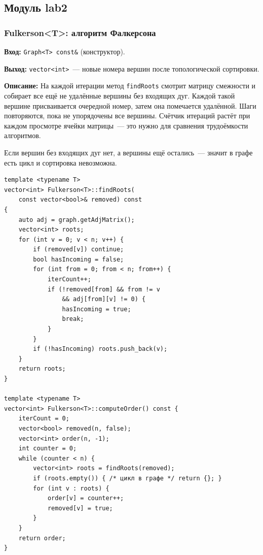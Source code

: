 \subsection{Модуль lab2}

\subsubsection{Fulkerson\textless T\textgreater: алгоритм Фалкерсона}

\textbf{Вход:} \texttt{Graph<T> const\&} (конструктор).

\textbf{Выход:} \texttt{vector<int>}~--- новые номера вершин после
топологической сортировки.

\textbf{Описание:} На каждой итерации метод \texttt{findRoots} смотрит
матрицу смежности и собирает все ещё не удалённые вершины без входящих дуг.
Каждой такой вершине присваивается очередной номер, затем она помечается
удалённой. Шаги повторяются, пока не упорядочены все вершины.
Счётчик итераций растёт при каждом просмотре ячейки матрицы~---
это нужно для сравнения трудоёмкости алгоритмов.

Если вершин без входящих дуг нет, а вершины ещё остались~--- значит в графе
есть цикл и сортировка невозможна.

\begin{lstlisting}[style=cstyle, caption={Поиск корней и вычисление порядка (fulkerson.cpp)}]
template <typename T>
vector<int> Fulkerson<T>::findRoots(
    const vector<bool>& removed) const
{
    auto adj = graph.getAdjMatrix();
    vector<int> roots;
    for (int v = 0; v < n; v++) {
        if (removed[v]) continue;
        bool hasIncoming = false;
        for (int from = 0; from < n; from++) {
            iterCount++;
            if (!removed[from] && from != v
                && adj[from][v] != 0) {
                hasIncoming = true;
                break;
            }
        }
        if (!hasIncoming) roots.push_back(v);
    }
    return roots;
}

template <typename T>
vector<int> Fulkerson<T>::computeOrder() const {
    iterCount = 0;
    vector<bool> removed(n, false);
    vector<int> order(n, -1);
    int counter = 0;
    while (counter < n) {
        vector<int> roots = findRoots(removed);
        if (roots.empty()) { /* цикл в графе */ return {}; }
        for (int v : roots) {
            order[v] = counter++;
            removed[v] = true;
        }
    }
    return order;
}
\end{lstlisting}

